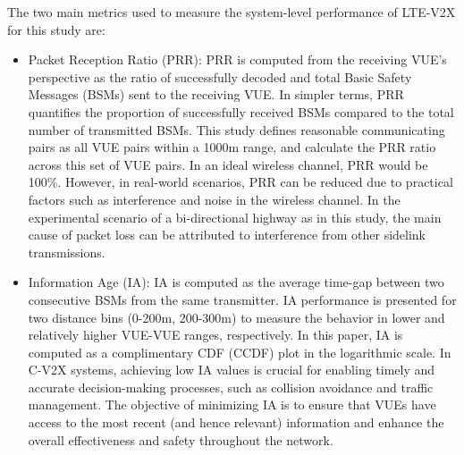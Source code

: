 \documentclass[iicol]{sn-jnl}%
\theoremstyle{thmstyleone}%
\theoremstyle{thmstyletwo}%
\theoremstyle{thmstylethree}%
\begin{document}
The two main metrics used to measure the system-level performance of LTE-V2X for this study are:
\begin{itemize}
    \item Packet Reception Ratio (PRR): PRR is computed from the receiving VUE’s perspective as the ratio of successfully decoded and total Basic Safety Messages (BSMs) sent to the receiving VUE.
    In simpler terms, PRR quantifies the proportion of successfully received BSMs compared to the total number of transmitted BSMs. This study defines reasonable communicating pairs as all VUE pairs within a 1000m range, and calculate the PRR ratio across this set of VUE pairs. In an ideal wireless channel, PRR would be 100\%. However, in real-world scenarios, PRR can be reduced due to practical factors such as interference and noise in the wireless channel. In the experimental scenario of a bi-directional highway as in this study, the main cause of packet loss can be attributed to interference from other sidelink transmissions.
    \item Information Age (IA): IA is computed as the average time-gap between two consecutive BSMs from the same transmitter. IA performance is presented for two distance bins (0-200m, 200-300m) to measure the behavior in lower and relatively higher VUE-VUE ranges, respectively. In this paper, IA is computed as a complimentary CDF (CCDF) plot in the logarithmic scale.
    In C-V2X systems, achieving low IA values is crucial for enabling timely and accurate decision-making processes, such as collision avoidance and traffic management. The objective of minimizing IA is to ensure that VUEs have access to the most recent (and hence relevant) information and enhance the overall effectiveness and safety throughout the network.
\end{itemize}
\end{document}
